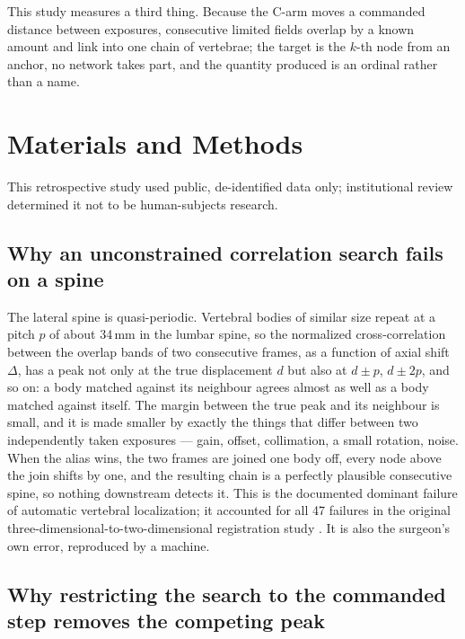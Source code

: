\documentclass[11pt,letterpaper]{article}
\begin{document}
This study measures a third thing. Because the C-arm moves a commanded distance between exposures,
consecutive limited fields overlap by a known amount and link into one chain of vertebrae; the target is
the $k$-th node from an anchor, no network takes part, and the quantity produced is an ordinal rather than
a name.

\section*{Materials and Methods}

This retrospective study used public, de-identified data only; institutional review determined it not to be
human-subjects research.

\subsection*{Why an unconstrained correlation search fails on a spine}

The lateral spine is quasi-periodic. Vertebral bodies of similar size repeat at a pitch $p$ of about
34\,mm in the lumbar spine, so the normalized cross-correlation between the overlap bands of two
consecutive frames, as a function of axial shift $\Delta$, has a peak not only at the true displacement $d$
but also at $d\pm p$, $d\pm 2p$, and so on: a body matched against its neighbour agrees almost as well as a
body matched against itself. The margin between the true peak and its neighbour is small, and it is made
smaller by exactly the things that differ between two independently taken exposures --- gain, offset,
collimation, a small rotation, noise. When the alias wins, the two frames are joined one body off, every
node above the join shifts by one, and the resulting chain is a perfectly plausible consecutive spine, so
nothing downstream detects it. This is the documented dominant failure of automatic vertebral localization;
it accounted for all 47 failures in the original three-dimensional-to-two-dimensional registration study
\citep{otake2012fail}. It is also the surgeon's own error, reproduced by a machine.

\subsection*{Why restricting the search to the commanded step removes the competing peak}
\end{document}
